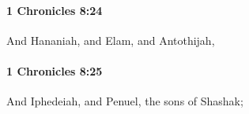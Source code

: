 		\paragraph{1 Chronicles 8:24} %
			\label{1CHRONICLES-8-24}

			And Hananiah, and Elam, and Antothijah,


		\paragraph{1 Chronicles 8:25} %
			\label{1CHRONICLES-8-25}

			And Iphedeiah, and Penuel, the sons of Shashak;


